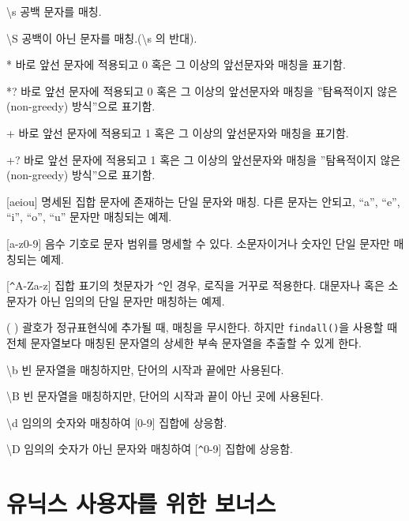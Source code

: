 {\textbackslash}s \newline
공백 문자를 매칭.

{\textbackslash}S \newline
공백이 아닌 문자를 매칭.({\textbackslash}s 의 반대).

* \newline
바로 앞선 문자에 적용되고 0 혹은 그 이상의 앞선문자와 매칭을 표기함.

*? \newline
바로 앞선 문자에 적용되고 0 혹은 그 이상의 앞선문자와 매칭을 ''탐욕적이지 않은(non-greedy) 방식''으로 표기함.

+ \newline
바로 앞선 문자에 적용되고 1 혹은 그 이상의 앞선문자와 매칭을 표기함.

+? \newline
바로 앞선 문자에 적용되고 1 혹은 그 이상의 앞선문자와 매칭을 ''탐욕적이지 않은(non-greedy) 방식''으로 표기함.

[aeiou] \newline
명세된 집합 문자에 존재하는 단일 문자와 매칭. 다른 문자는 안되고, ``a'', ``e'', ``i'', ``o'', ``u'' 문자만 매칭되는 예제.

[a-z0-9] \newline
음수 기호로 문자 범위를 명세할 수 있다. 소문자이거나 숫자인 단일 문자만 매칭되는 예제.

[\verb"^"A-Za-z] \newline
집합 표기의 첫문자가 {\verb"^"}인 경우, 로직을 거꾸로 적용한다. 대문자나 혹은 소문자가 아닌 임의의 단일 문자만 매칭하는 예제.

( ) \newline
괄호가 정규표현식에 추가될 때, 매칭을 무시한다. 하지만 {\tt findall()}을 사용할 때 전체 문자열보다 매칭된 문자열의 상세한 부속 문자열을 추출할 수 있게 한다.

{\textbackslash}b \newline
빈 문자열을 매칭하지만, 단어의 시작과 끝에만 사용된다.

{\textbackslash}B \newline
빈 문자열을 매칭하지만, 단어의 시작과 끝이 아닌 곳에 사용된다.

{\textbackslash}d \newline
임의의 숫자와 매칭하여 [0-9] 집합에 상응함.

{\textbackslash}D \newline
임의의 숫자가 아닌 문자와 매칭하여 [\verb"^"0-9] 집합에 상응함.

\section{유닉스 사용자를 위한 보너스}

